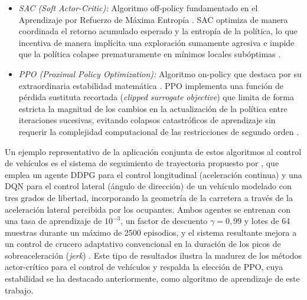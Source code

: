 \begin{itemize}
\begin{itemize}
        \item \textit{SAC (Soft Actor-Critic):} Algoritmo off-policy fundamentado en el Aprendizaje por Refuerzo de Máxima Entropía \citep{xue2022using}. SAC optimiza de manera coordinada el retorno acumulado esperado y la entropía de la política, lo que incentiva de manera implícita una exploración sumamente agresiva e impide que la política colapse prematuramente en mínimos locales subóptimas \citep{xue2022using, sivashangaran2023deep}.
        \item \textit{PPO (Proximal Policy Optimization):} Algoritmo on-policy que destaca por su extraordinaria estabilidad matemática \citep{ge2024deep}. PPO implementa una función de pérdida sustituta recortada (\textit{clipped surrogate objective}) que limita de forma estricta la magnitud de los cambios en la actualización de la política entre iteraciones sucesivas, evitando colapsos catastróficos de aprendizaje sin requerir la complejidad computacional de las restricciones de segundo orden \citep{ge2024deep}.
    \end{itemize}
\end{itemize}

Un ejemplo representativo de la aplicación conjunta de estos algoritmos al control de vehículos es el sistema de seguimiento de trayectoria propuesto por \citet{barreno2023comparison, barreno2025novel}, que emplea un agente DDPG para el control longitudinal (aceleración continua) y una DQN para el control lateral (ángulo de dirección) de un vehículo modelado con tres grados de libertad, incorporando la geometría de la carretera a través de la aceleración lateral percibida por los ocupantes. Ambos agentes se entrenan con una tasa de aprendizaje de $10^{-3}$, un factor de descuento $\gamma = 0{,}99$ y lotes de 64 muestras durante un máximo de 2500 episodios, y el sistema resultante mejora a un control de crucero adaptativo convencional en la duración de los picos de sobreaceleración (\textit{jerk}) \citep{barreno2023comparison}. Este tipo de resultados ilustra la madurez de los métodos actor-crítico para el control de vehículos y respalda la elección de PPO, cuya estabilidad se ha destacado anteriormente, como algoritmo de aprendizaje de este trabajo.

